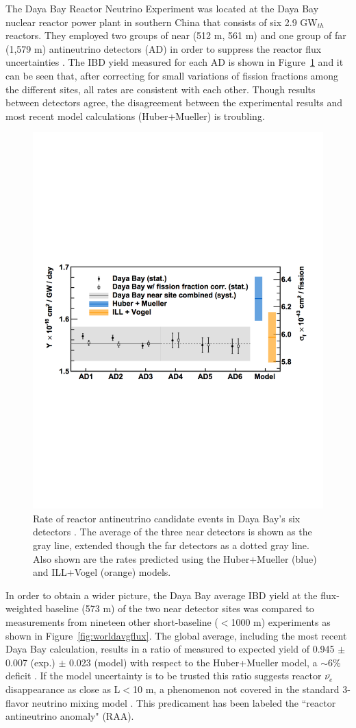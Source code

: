 The Daya Bay Reactor Neutrino Experiment was located at the Daya Bay nuclear reactor power plant in southern China that consists of six 2.9 GW$_{th}$ reactors. They employed two groups of near (512 m, 561 m) and one group of far (1,579 m) antineutrino detectors (AD) in order to suppress the reactor flux uncertainties \cite{An:2015qga,DayaBayAnomaly}.
The IBD yield measured for each AD is shown in Figure~\ref{fig:dayabayflux} and it can be seen that, after correcting for small variations of fission fractions among the different sites, all rates are consistent with each other. Though results between detectors agree, the disagreement between the experimental results and most recent model calculations (Huber+Mueller) is troubling. 

\begin{figure}[h]
	\centering
	\includegraphics[width=0.7\linewidth]{tex/3-reactorneutrinos-images/DayaBayFlux}
	\caption[Daya Bay $\bar{\nu_{e}}$ flux.]{Rate of reactor antineutrino candidate events in Daya Bay's six detectors \cite{DayaBayAnomaly}. The average of the three near detectors is shown as the gray line, extended though the far detectors as a dotted gray line. Also shown are the rates predicted using the Huber+Mueller (blue) and ILL+Vogel (orange) models.}
	\label{fig:dayabayflux}
\end{figure}

In order to obtain a wider picture, the Daya Bay average IBD yield at the flux-weighted baseline (573 m) of the two near detector sites was compared to measurements from nineteen other short-baseline ($<$1000 m) experiments as shown in Figure~\ref{fig:worldavgflux}. 
The global average, including the most recent Daya Bay calculation, results in a ratio of measured to expected yield of 0.945 $\pm$ 0.007 (exp.) $\pm$ 0.023 (model) with respect to the Huber+Mueller model, a $\sim$6\% deficit \cite{DayaBayFlux2018}.
If the model uncertainty is to be trusted this ratio suggests reactor $\bar{\nu_{e}}$ disappearance as close as L$<$10 m, a phenomenon not covered in the standard 3-flavor neutrino mixing model \cite{HayesVogel}.  
This predicament has been labeled the ``reactor antineutrino anomaly" (RAA). 

